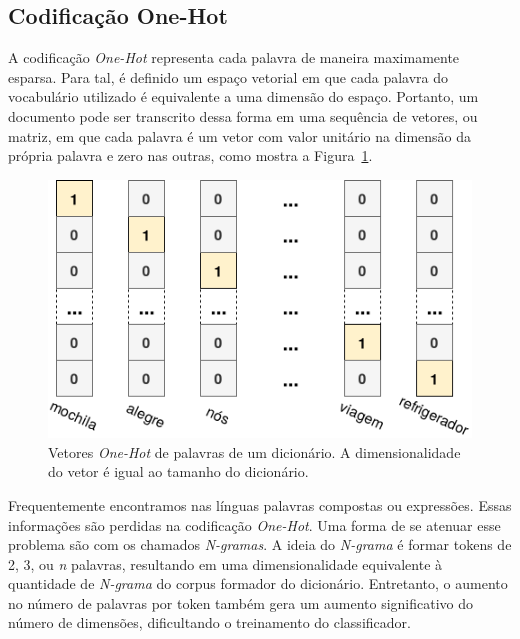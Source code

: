 \subsection{Codificação One-Hot}

A codificação \textit{One-Hot} representa cada palavra de maneira maximamente
esparsa.
Para tal, é definido um espaço vetorial em que cada palavra do vocabulário
utilizado é equivalente a uma dimensão do espaço.
Portanto, um documento pode ser transcrito dessa forma em uma sequência de
vetores, ou matriz, em que cada palavra é um vetor com valor unitário na
dimensão da própria palavra e zero nas outras, como mostra a
Figura~\ref{fig:onehot}.

\begin{figure}[h]
\begin{center} {
    \begin{center}
    \includegraphics[scale=0.30]{images/onehot.png}
    \caption{Vetores \textit{One-Hot} de palavras de um dicionário.
             A dimensionalidade do vetor é igual ao tamanho do dicionário.}
    \label{fig:onehot}
    \end{center}
}
\end{center}
\end{figure}

Frequentemente encontramos nas línguas palavras compostas ou expressões.
Essas informações são perdidas na codificação \textit{One-Hot}.
Uma forma de se atenuar esse problema são com os chamados \textit{N-gramas}.
A ideia do \textit{N-grama} é formar tokens de 2, 3, ou \textit{n} palavras,
resultando em uma dimensionalidade equivalente à quantidade de
\textit{N-grama} do corpus formador do dicionário.
Entretanto, o aumento no número de palavras por token também gera um aumento
significativo do número de dimensões, dificultando o treinamento do
classificador.

